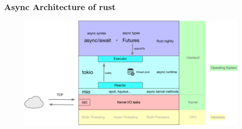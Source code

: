 \begin{frame}[fragile]
    \frametitle{Async Architecture of rust}
    
    \centering
    \begin{figure}
        \includegraphics[width=0.9\linewidth]{figs/rust-async-arch.png}
    \end{figure}
    
    
\end{frame}
